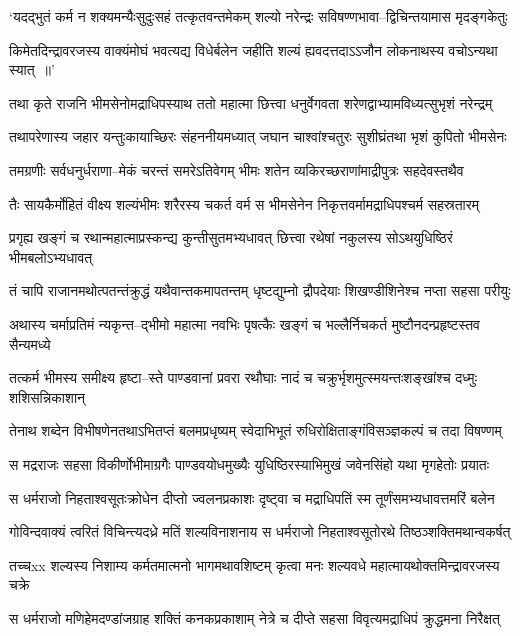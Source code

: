 \twolineshloka
{`यदद्भुतं कर्म न शक्यमन्यैःसुदुःसहं तत्कृतवन्तमेकम्}
{शल्यो नरेन्द्रः सविषण्णभावा--द्विचिन्तयामास मृदङ्गकेतुः}


\twolineshloka
{किमेतदिन्द्रावरजस्य वाक्यंमोघं भवत्यद्य विधेर्बलेन}
{जहीति शल्यं ह्यवदत्तदाऽऽजौन लोकनाथस्य वचोऽन्यथा स्यात् ॥'}


\twolineshloka
{तथा कृते राजनि भीमसेनोमद्राधिपस्याथ ततो महात्मा}
{छित्त्वा धनुर्वेगवता शरेणद्वाभ्यामविध्यत्सुभृशं नरेन्द्रम्}


\twolineshloka
{तथापरेणास्य जहार यन्तुःकायाच्छिरः संहननीयमध्यात्}
{जघान चाश्वांश्चतुरः सुशीघ्रंतथा भृशं कुपितो भीमसेनः}


\twolineshloka
{तमग्रणीः सर्वधनुर्धराणा--मेकं चरन्तं समरेऽतिवेगम्}
{भीमः शतेन व्यकिरच्छराणांमाद्रीपुत्रः सहदेवस्तथैव}


\twolineshloka
{तैः सायकैर्मोहितं वीक्ष्य शल्यंभीमः शरैरस्य चकर्त वर्म}
{स भीमसेनेन निकृत्तवर्मामद्राधिपश्चर्म सहस्रतारम्}


\twolineshloka
{प्रगृह्य खङ्गं च रथान्महात्माप्रस्कन्द्य कुन्तीसुतमभ्यधावत्}
{छित्त्वा रथेषां नकुलस्य सोऽथयुधिष्ठिरं भीमबलोऽभ्यधावत्}


\twolineshloka
{तं चापि राजानमथोत्पतन्तंक्रुद्धं यथैवान्तकमापतन्तम्}
{धृष्टद्युम्नो द्रौपदेयाः शिखण्डीशिनेश्च नप्ता सहसा परीयुः}


\twolineshloka
{अथास्य चर्माप्रतिमं न्यकृन्त--द्भीमो महात्मा नवभिः पृषत्कैः}
{खङ्गं च भल्लैर्निचकर्त मुष्टौनदन्प्रहृष्टस्तव सैन्यमध्ये}


\twolineshloka
{तत्कर्म भीमस्य समीक्ष्य हृष्टा--स्ते पाण्डवानां प्रवरा रथौघाः}
{नादं च चक्रुर्भृशमुत्स्मयन्तःशङ्खांश्च दध्मुः शशिसन्निकाशान्}


\twolineshloka
{तेनाथ शब्देन विभीषणेनतथाऽभितप्तं बलमप्रधृष्यम्}
{स्वेदाभिभूतं रुधिरोक्षिताङ्गंविसञ्ज्ञकल्पं च तदा विषण्णम्}


\twolineshloka
{स मद्रराजः सहसा विकीर्णोभीमाग्रगैः पाण्डवयोधमुख्यैः}
{युधिष्ठिरस्याभिमुखं जवेनसिंहो यथा मृगहेतोः प्रयातः}


\twolineshloka
{स धर्मराजो निहताश्वसूतःक्रोधेन दीप्तो ज्वलनप्रकाशः}
{दृष्ट्वा च मद्राधिपतिं स्म तूर्णंसमभ्यधावत्तमरिं बलेन}


\twolineshloka
{गोविन्दवाक्यं त्वरितं विचिन्त्यदध्रे मतिं शल्यविनाशनाय}
{स धर्मराजो निहताश्वसूतोरथे तिष्ठञ्शक्तिमथान्वकर्षत्}


\twolineshloka
{तच्चxx शल्यस्य निशाम्य कर्मतमात्मनो भागमथावशिष्टम्}
{कृत्वा मनः शल्यवधे महात्मायथोक्तमिन्द्रावरजस्य चक्रे}


\twolineshloka
{स धर्मराजो मणिहेमदण्डांजग्राह शक्तिं कनकप्रकाशाम्}
{नेत्रे च दीप्ते सहसा विवृत्यमद्राधिपं क्रुद्धमना निरैक्षत्}


